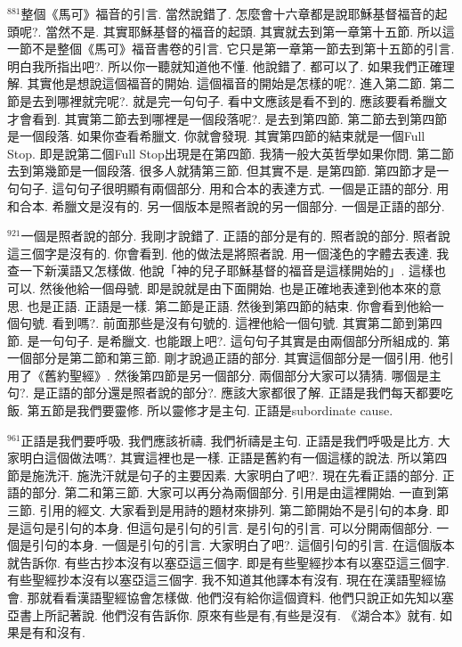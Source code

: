 \documentclass{book}
\begin{document}
$^{881}$整個《馬可》福音的引言.
當然說錯了.
怎麼會十六章都是說耶穌基督福音的起頭呢?.
當然不是.
其實耶穌基督的福音的起頭.
其實就去到第一章第十五節.
所以這一節不是整個《馬可》福音書卷的引言.
它只是第一章第一節去到第十五節的引言.
明白我所指出吧?.
所以你一聽就知道他不懂.
他說錯了.
都可以了.
如果我們正確理解.
其實他是想說這個福音的開始.
這個福音的開始是怎樣的呢?.
進入第二節.
第二節是去到哪裡就完呢?.
就是完一句句子.
看中文應該是看不到的.
應該要看希臘文才會看到.
其實第二節去到哪裡是一個段落呢?.
是去到第四節.
第二節去到第四節是一個段落.
如果你查看希臘文.
你就會發現.
其實第四節的結束就是一個Full Stop.
即是說第二個Full Stop出現是在第四節.
我猜一般大英哲學如果你問.
第二節去到第幾節是一個段落.
很多人就猜第三節.
但其實不是.
是第四節.
第四節才是一句句子.
這句句子很明顯有兩個部分.
用和合本的表達方式.
一個是正語的部分.
用和合本.
希臘文是沒有的.
另一個版本是照者說的另一個部分.
一個是正語的部分.

$^{921}$一個是照者說的部分.
我剛才說錯了.
正語的部分是有的.
照者說的部分.
照者說這三個字是沒有的.
你會看到.
他的做法是將照者說.
用一個淺色的字體去表達.
我查一下新漢語又怎樣做.
他說「神的兒子耶穌基督的福音是這樣開始的」.
這樣也可以.
然後他給一個母號.
即是說就是由下面開始.
也是正確地表達到他本來的意思.
也是正語.
正語是一樣.
第二節是正語.
然後到第四節的結束.
你會看到他給一個句號.
看到嗎?.
前面那些是沒有句號的.
這裡他給一個句號.
其實第二節到第四節.
是一句句子.
是希臘文.
也能跟上吧?.
這句句子其實是由兩個部分所組成的.
第一個部分是第二節和第三節.
剛才說過正語的部分.
其實這個部分是一個引用.
他引用了《舊約聖經》.
然後第四節是另一個部分.
兩個部分大家可以猜猜.
哪個是主句?.
是正語的部分還是照者說的部分?.
應該大家都很了解.
正語是我們每天都要吃飯.
第五節是我們要靈修.
所以靈修才是主句.
正語是subordinate cause.

$^{961}$正語是我們要呼吸.
我們應該祈禱.
我們祈禱是主句.
正語是我們呼吸是比方.
大家明白這個做法嗎?.
其實這裡也是一樣.
正語是舊約有一個這樣的說法.
所以第四節是施洗汗.
施洗汗就是句子的主要因素.
大家明白了吧?.
現在先看正語的部分.
正語的部分.
第二和第三節.
大家可以再分為兩個部分.
引用是由這裡開始.
一直到第三節.
引用的經文.
大家看到是用詩的題材來排列.
第二節開始不是引句的本身.
即是這句是引句的本身.
但這句是引句的引言.
是引句的引言.
可以分開兩個部分.
一個是引句的本身.
一個是引句的引言.
大家明白了吧?.
這個引句的引言.
在這個版本就告訴你.
有些古抄本沒有以塞亞這三個字.
即是有些聖經抄本有以塞亞這三個字.
有些聖經抄本沒有以塞亞這三個字.
我不知道其他譯本有沒有.
現在在漢語聖經協會.
那就看看漢語聖經協會怎樣做.
他們沒有給你這個資料.
他們只說正如先知以塞亞書上所記著說.
他們沒有告訴你.
原來有些是有,有些是沒有.
《湖合本》就有.
如果是有和沒有.
\end{document}
